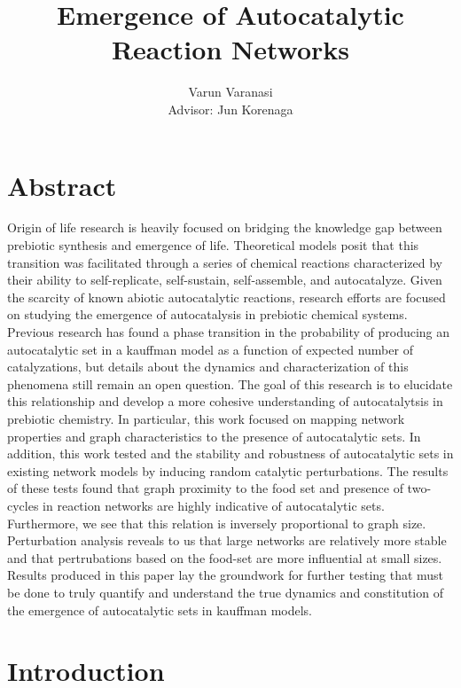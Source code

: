 \documentclass[11pt]{article}
\title{Emergence of Autocatalytic Reaction Networks}
\author{Varun Varanasi \\{Advisor: Jun Korenaga}}
\begin{document}
\maketitle
\newpage

\tableofcontents

\newpage

\section{Abstract}

Origin of life research is heavily focused on bridging the knowledge gap between prebiotic synthesis and emergence of life. 
Theoretical models posit that this transition was facilitated through a series of chemical reactions characterized by their ability to self-replicate, self-sustain, self-assemble, and autocatalyze.
Given the scarcity of known abiotic autocatalytic reactions, research efforts are focused on studying the emergence of autocatalysis in prebiotic chemical systems. 
Previous research has found a phase transition in the probability of producing an autocatalytic set in a kauffman model as a function of expected number of catalyzations, but details about the dynamics and characterization of this phenomena still remain an open question.
The goal of this research is to elucidate this relationship and develop a more cohesive understanding of autocatalytsis in prebiotic chemistry.
In particular, this work focused on mapping network properties and graph characteristics to the presence of autocatalytic sets. 
In addition, this work tested and the stability and robustness of autocatalytic sets in existing network models by inducing random catalytic perturbations.
The results of these tests found that graph proximity to the food set and presence of two-cycles in reaction networks are highly indicative of autocatalytic sets.
Furthermore, we see that this relation is inversely proportional to graph size. 
Perturbation analysis reveals to us that large networks are relatively more stable and that pertrubations based on the food-set are more influential at small sizes.
Results produced in this paper lay the groundwork for further testing that must be done to truly quantify and understand the true dynamics and constitution of the emergence of autocatalytic sets in kauffman models. 

\newpage

\section{Introduction}
\end{document}
